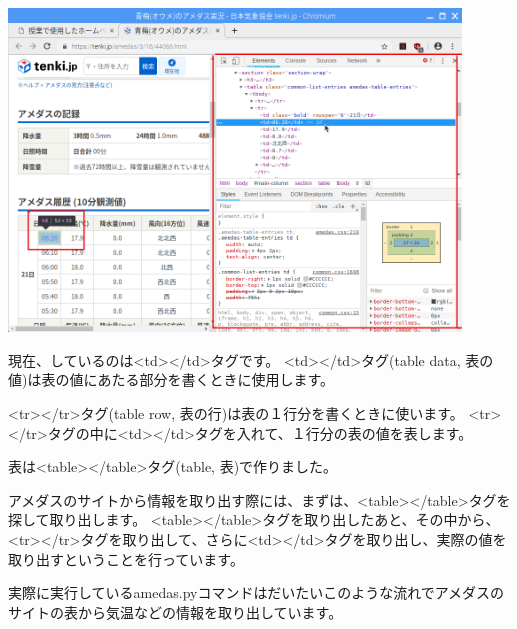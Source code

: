 \begin{center}
\includegraphics[width=0.9\textwidth]{./text08-img/textbook-img035-2.png}

\end{center}
現在、しているのは{\textless}td{\textgreater}{\textless}/td{\textgreater}タグです。
{\textless}td{\textgreater}{\textless}/td{\textgreater}タグ(table
data,
表の値)は表の値にあたる部分を書くときに使用します。

{\textless}tr{\textgreater}{\textless}/tr{\textgreater}タグ(table row,
表の行)は表の１行分を書くときに使います。
{\textless}tr{\textgreater}{\textless}/tr{\textgreater}タグの中に{\textless}td{\textgreater}{\textless}/td{\textgreater}タグを入れて、１行分の表の値を表します。


表は{\textless}table{\textgreater}{\textless}/table{\textgreater}タグ(table,
表)で作りました。


アメダスのサイトから情報を取り出す際には、まずは、{\textless}table{\textgreater}{\textless}/table{\textgreater}タグを探して取り出します。
{\textless}table{\textgreater}{\textless}/table{\textgreater}タグを取り出したあと、その中から、{\textless}tr{\textgreater}{\textless}/tr{\textgreater}タグを取り出して、さらに{\textless}td{\textgreater}{\textless}/td{\textgreater}タグを取り出し、実際の値を取り出すということを行っています。


実際に実行しているamedas.pyコマンドはだいたいこのような流れでアメダスのサイトの表から気温などの情報を取り出しています。


\bigskip


\bigskip



